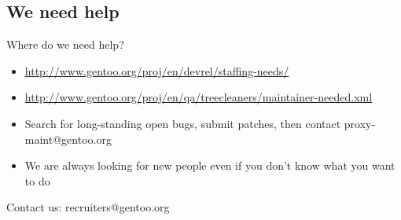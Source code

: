 \subsection{We need help}
\begin{frame}{Where do we need help?}
	\begin{itemize}
		\item \href{http://www.gentoo.org/proj/en/devrel/staffing-needs/}{http://www.gentoo.org/proj/en/devrel/staffing-needs/}
		\item \href{http://www.gentoo.org/proj/en/qa/treecleaners/maintainer-needed.xml}{http://www.gentoo.org/proj/en/qa/treecleaners/maintainer-needed.xml}
		\item Search for long-standing open bugs, submit patches, then contact proxy-maint@gentoo.org
		\item We are always looking for new people even if you don't know what you want to do
	\end{itemize}
Contact us: recruiters@gentoo.org
\end{frame}
